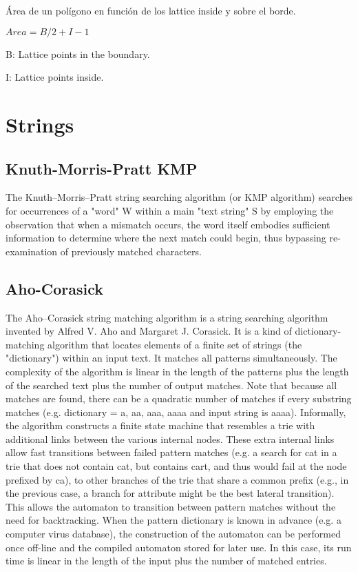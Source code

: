 \documentclass[10pt,letterpaper,twocolumn,twosided]{article}
\newcommand{\codigofuente}[1]{

\dotfill
}
\begin{document}
Área de un polígono en función de los lattice inside y sobre el borde.


$ Area = B/2 + I - 1 $

B: Lattice points in the boundary.

I: Lattice points inside.

\section{Strings}

\subsection{Knuth-Morris-Pratt KMP}

The Knuth–Morris–Pratt string searching algorithm (or KMP algorithm) searches for occurrences of a "word" W within a main "text string" S by employing the observation that when a mismatch occurs, the word itself embodies sufficient information to determine where the next match could begin, thus bypassing re-examination of previously matched characters.

\codigofuente{src/string/kmp.cpp}

\subsection{Aho-Corasick}

The Aho–Corasick string matching algorithm is a string searching algorithm invented by Alfred V. Aho and Margaret J. Corasick. It is a kind of dictionary-matching algorithm that locates elements of a finite set of strings (the "dictionary") within an input text. It matches all patterns simultaneously. The complexity of the algorithm is linear in the length of the patterns plus the length of the searched text plus the number of output matches. Note that because all matches are found, there can be a quadratic number of matches if every substring matches (e.g. dictionary = a, aa, aaa, aaaa and input string is aaaa).
Informally, the algorithm constructs a finite state machine that resembles a trie with additional links between the various internal nodes. These extra internal links allow fast transitions between failed pattern matches (e.g. a search for cat in a trie that does not contain cat, but contains cart, and thus would fail at the node prefixed by ca), to other branches of the trie that share a common prefix (e.g., in the previous case, a branch for attribute might be the best lateral transition). This allows the automaton to transition between pattern matches without the need for backtracking.
When the pattern dictionary is known in advance (e.g. a computer virus database), the construction of the automaton can be performed once off-line and the compiled automaton stored for later use. In this case, its run time is linear in the length of the input plus the number of matched entries.
\end{document}
